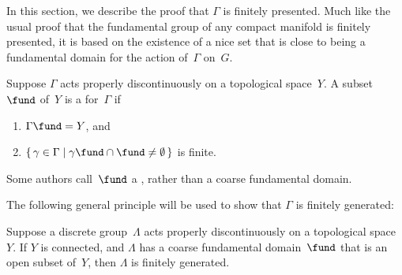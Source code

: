 In this section, we describe the proof that $\Gamma$ is
finitely presented. Much like the usual proof that the fundamental group of any compact manifold is finitely presented, it is based on the existence of a nice set that is close to being a fundamental domain for the action of~$\Gamma$ on~$G$.

\begin{defn} \label{CoarseFundDomDefn}
 Suppose $\Gamma$ acts properly discontinuously on a
topological space~$Y$.
 A subset $\fund$ 
  of~$Y$ is a  for~$\Gamma$ if%
\noprelistbreak
 \begin{enumerate}
 \item $\Gamma \fund = Y$, and
 \item \label{CoarseFundDomDefn-finite}
 $\{\, \gamma \in \Gamma \mid \gamma \fund \cap \fund \neq
\emptyset \,\}$ is finite.
 \end{enumerate}
 \end{defn}

\begin{other}
Some authors call~$\fund$ a , rather than a coarse fundamental domain.
\end{other}

The following general principle will be used to show that $\Gamma$ is finitely generated:

\begin{prop} \label{FundDom->fg}
 Suppose a discrete group~$\Lambda$ acts properly
discontinuously on a topological space~$Y$. If $Y$ is
connected, and $\Lambda$ has a coarse fundamental
domain~$\fund$ that is an open subset of~$Y$, then
$\Lambda$ is finitely generated.
 \end{prop}

